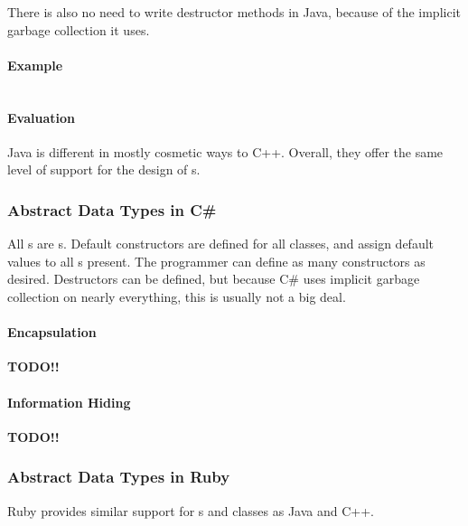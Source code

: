 There is also no need to write destructor methods in Java, because of the implicit garbage collection it uses.

\paragraph{Example}\label{par:Java_Abstract_Data_Type_Example}
\inputminted[frame=lines,linenos]{java}{./EDAP05-Concepts_Programming_Languages-Sections/Abstract_Data_Types/Code/Class_Example-Stack-Java.java}

\paragraph{Evaluation}\label{par:Java_Abstract_Data_Type_Evaluation}
Java is different in mostly cosmetic ways to C++.
Overall, they offer the same level of support for the design of s.

\subsubsection{Abstract Data Types in C\#}\label{subsubsec:Abstract_Data_Types_CSharp}
All s are s.
Default constructors are defined for all classes, and assign default values to all  s present.
The programmer can define as many constructors as desired.
Destructors can be defined, but because C\# uses implicit garbage collection on nearly everything, this is usually not a big deal.

\paragraph{Encapsulation}\label{par:Objective_C_Encapsulation}
\textbf{TODO!!}

\paragraph{Information Hiding}\label{par:Objective_C_Info_Hiding}
\textbf{TODO!!}

\subsubsection{Abstract Data Types in Ruby}\label{subsubsec:Abstract_Data_Types_Ruby}
Ruby provides similar support for s and classes as Java and C++.

